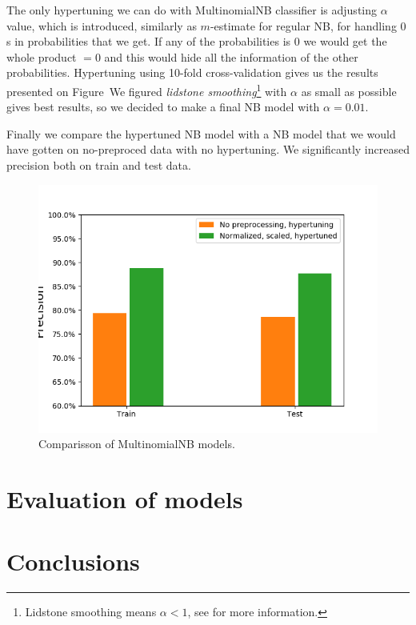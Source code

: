 \documentclass[11pt,a4paper]{article}
\begin{document}
%
The only hypertuning we can do with MultinomialNB classifier is adjusting $\alpha$ value, which is introduced, similarly as $m$-estimate for regular NB, for handling $0$s in probabilities that we get. If any of the probabilities is $0$ we would get the whole product $=0$ and this would hide all the information of the other probabilities. 
Hypertuning using 10-fold cross-validation gives us the results presented on Figure~We figured {\em lidstone smoothing}\footnote{Lidstone smoothing means $\alpha <1$, see \cite[1.9.]{scikit} for more information.} with $\alpha$ as small as possible gives best results, so we decided to make a final NB model with $\alpha = 0.01$. 

Finally we compare the hypertuned NB model with a NB model that we would have gotten on no-preproced data with no hypertuning. We significantly increased precision both on train and test data.
\begin{figure}[ht!]
\centering
\includegraphics[scale=0.60]{mNB_model_comparison_precision.png}
\caption{Comparisson of MultinomialNB models.}
\label{fig:mNB_model_comparison_precision}
\end{figure}



\newpage
	

\section{Evaluation of models}
\label{sec-evaluation}

	

\section{Conclusions}
\end{document}

